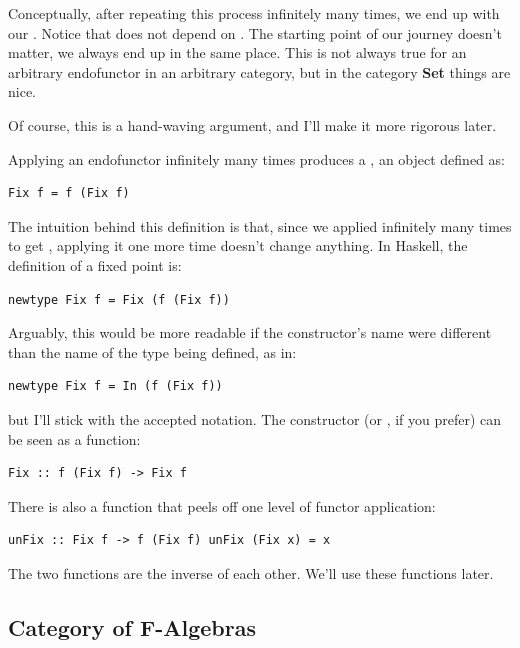 Conceptually, after repeating this process infinitely many times, we end
up with our . Notice that  does not depend on
. The starting point of our journey doesn't matter, we always
end up in the same place. This is not always true for an arbitrary
endofunctor in an arbitrary category, but in the category \textbf{Set}
things are nice.

Of course, this is a hand-waving argument, and I'll make it more
rigorous later.

Applying an endofunctor infinitely many times produces a , an object defined as:

\begin{verbatim}
Fix f = f (Fix f)
\end{verbatim}

The intuition behind this definition is that, since we applied
 infinitely many times to get , applying it one
more time doesn't change anything. In Haskell, the definition of a fixed
point is:

\begin{verbatim}
newtype Fix f = Fix (f (Fix f))
\end{verbatim}

Arguably, this would be more readable if the constructor's name were
different than the name of the type being defined, as in:

\begin{verbatim}
newtype Fix f = In (f (Fix f))
\end{verbatim}

but I'll stick with the accepted notation. The constructor 
(or , if you prefer) can be seen as a function:

\begin{verbatim}
Fix :: f (Fix f) -> Fix f
\end{verbatim}

There is also a function that peels off one level of functor
application:

\begin{verbatim}
unFix :: Fix f -> f (Fix f) unFix (Fix x) = x
\end{verbatim}

The two functions are the inverse of each other. We'll use these
functions later.

\subsection{Category of F-Algebras}\label{category-of-f-algebras}

